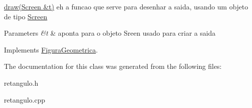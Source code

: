 \hyperlink{classRetangulo_ac088dd6d3f4f3d3f80363a868c2e74f1}{draw(\+Screen \&t)} eh a funcao que serve para desenhar a saida, usando um objeto de tipo \hyperlink{classScreen}{Screen} 


\begin{DoxyParams}{Parameters}
{\em \&t} & aponta para o objeto Sreen usado para criar a saida \\
\hline
\end{DoxyParams}


Implements \hyperlink{classFiguraGeometrica_a8ee8dedc060b6059a805ea091aef2c41}{Figura\+Geometrica}.



The documentation for this class was generated from the following files\+:\begin{DoxyCompactItemize}
\item 
retangulo.\+h\item 
retangulo.\+cpp\end{DoxyCompactItemize}
